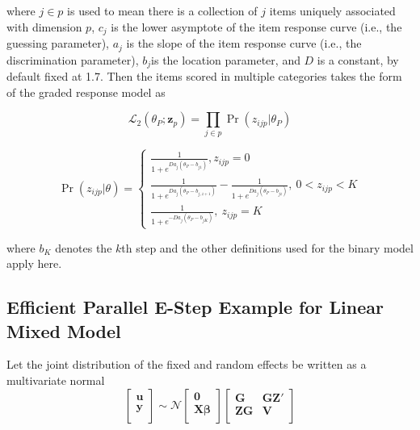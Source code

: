 \documentclass[12pt]{article}
\begin{document}
\noindent where $j \in p$ is used to mean there is a collection of $j$ items uniquely associated with dimension $p$, $c_j$ is the lower asymptote of the item response curve (i.e., the guessing parameter), $a_j$ is the slope of the item response curve (i.e., the discrimination parameter), $b_j$is the location parameter, and $D$ is a constant, by default fixed at 1.7. Then the items scored in multiple categories takes the form of the graded response model as

\begin{equation}
\mathcal{L}_2(\theta_P;\bm{z}_p) = \prod_{j \in p}\Pr(z_{ijp}|\theta_P)\nonumber
\end{equation}

\begin{equation}
\Pr(z_{ijp}|\theta)=\left\{  \begin{array}{c}
\frac{1}{1+e^{Da_j(\theta_P-b_{j1})}},z_{ijp}=0 \\
\frac{1}{1+e^{Da_j(\theta_P-b_{j,z+1})}} - \frac{1}{1+e^{Da_j(\theta_P-b_{jz})}}, \ 0 < z_{ijp} < K \\
\frac{1}{1+e^{-Da_j(\theta_P-b_{jK})}},\ z_{ijp}=K 
 \end{array} \right. 
\end{equation} 
 
\noindent where $b_K$ denotes the $k$th step and the other definitions used for the binary model apply here.

\subsection*{Efficient Parallel E-Step Example for Linear Mixed Model}

Let the joint distribution of the fixed and random effects be written as a multivariate normal
\begin{equation}
\left [ 
\begin{array}{cc}
\bm{u} \\
\bm{y} \\
\end{array}
\right ]
\sim \mathcal{N}
\left [ 
\begin{array}{cc}
\bm{0} \\
\bm{X\beta} \\
\end{array}
\right ]
\left [ 
\begin{array}{cccc}
\bm{G} & \bm{GZ'} \\
\bm{ZG} & \bm{V} \\
\end{array}
\right ]
\end{equation}
\end{document}

